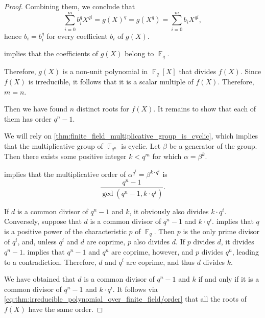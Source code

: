 \begin{proof}
  Combining them, we conclude that
  \begin{equation*}
    \sum_{i=0}^m b_i^q X^{qi} = g(X)^q = g(X^q) = \sum_{i=0}^m b_i X^{qi},
  \end{equation*}
  hence \( b_i = b_i^q \) for every coefficient \( b_i \) of \( g(X) \).

   implies that the coefficients of \( g(X) \) belong to \( \BbbF_q \).

  Therefore, \( g(X) \) is a non-unit polynomial in \( \BbbF_q[X] \) that divides \( f(X) \). Since \( f(X) \) is irreducible, it follows that it is a scalar multiple of \( f(X) \). Therefore, \( m = n \).

  Then we have found \( n \) distinct roots for \( f(X) \). It remains to show that each of them has order \( q^n - 1 \).

  We will rely on \cref{thm:finite_field_multiplicative_group_is_cyclic}, which implies that the multiplicative group of \( \BbbF_{q^n} \) is cyclic. Let \( \beta \) be a generator of the group. Then there exists some positive integer \( k < q^m \) for which \( \alpha = \beta^k \).

   implies that the multiplicative order of \( \alpha^{q^i} = \beta^{k \cdot q^i} \) is
  \begin{equation}\label{eq:thm:irreducible_polynomial_over_finite_field/order}
    \frac {q^n - 1} {\gcd(q^n - 1, k \cdot q^i)}.
  \end{equation}

  If \( d \) is a common divisor of \( q^n - 1 \) and \( k \), it obviously also divides \( k \cdot q^i \). Conversely, suppose that \( d \) is a common divisor of \( q^n - 1 \) and \( k \cdot q^i \).  implies that \( q \) is a positive power of the characteristic \( p \) of \( \BbbF_q \). Then \( p \) is the only prime divisor of \( q^i \), and, unless \( q^i \) and \( d \) are coprime, \( p \) also divides \( d \). If \( p \) divides \( d \), it divides \( q^n - 1 \).  implies that \( q^n - 1 \) and \( q^n \) are coprime, however, and \( p \) divides \( q^n \), leading to a contradiction. Therefore, \( d \) and \( q^i \) are coprime, and thus \( d \) divides \( k \).

  We have obtained that \( d \) is a common divisor of \( q^n - 1 \) and \( k \) if and only if it is a common divisor of \( q^n - 1 \) and \( k \cdot q^i \). It follows via \eqref{eq:thm:irreducible_polynomial_over_finite_field/order} that all the roots of \( f(X) \) have the same order.
\end{proof}


